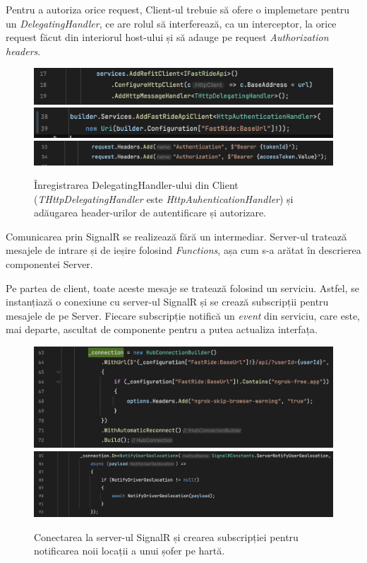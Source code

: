 Pentru a autoriza orice request, Client-ul trebuie să ofere o implemetare pentru un \textit{DelegatingHandler}, ce 
are rolul să interferează, ca un interceptor, la orice request făcut din interiorul host-ului și să adauge
pe request \textit{Authorization headers}.

\begin{figure}[H]
    \centering
    \includegraphics[width=15cm]{Assets/configureDelegate1.png}
    \includegraphics[width=15cm]{Assets/configureDelegate2.png}
    \includegraphics[width=16cm]{Assets/configureDelegate3.png}
    \caption{Înregistrarea DelegatingHandler-ului din Client (\textit{THttpDelegatingHandler} este \textit{HttpAuhenticationHandler})
        și adăugarea header-urilor de autentificare și autorizare.}
    \label{fig:configureDelegate}
\end{figure}

Comunicarea prin SignalR se realizează fără un intermediar. Server-ul tratează mesajele de intrare și de ieșire folosind
\textit{Functions}, așa cum s-a arătat în descrierea componentei Server.

Pe partea de client, toate aceste mesaje se tratează folosind un serviciu. Astfel, se instanțiază
o conexiune cu server-ul SignalR și se crează subscripții pentru mesajele de pe Server.
Fiecare subscripție notifică un \textit{event} din serviciu, care este, mai departe, ascultat de componente pentru
a putea actualiza interfața.

\begin{figure}[H]
    \centering
    \includegraphics[width=16cm]{Assets/signalrConnect.png}
    \includegraphics[width=16cm]{Assets/signalROn.png}
    \caption{Conectarea la server-ul SignalR și crearea subscripției pentru notificarea noii locații a unui șofer pe hartă.}
    \label{fig:signalR}
\end{figure}

